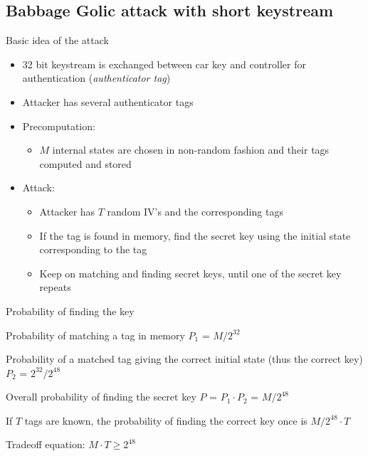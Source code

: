 \documentclass{beamer}
\begin{document}
\subsection{Babbage Golic attack with short keystream}

\begin{frame}{Basic idea of the attack}
\small{
\begin{itemize}
	\item 32 bit keystream is exchanged between car key and controller for authentication (\emph{authenticator tag})
	\item Attacker has several authenticator tags
	\item Precomputation: 
	\begin{itemize}
		\item $M$ internal states are chosen in non-random fashion and their tags computed and stored
	\end{itemize}
	\item Attack: 
	\begin{itemize}
		\item Attacker has $T$ random IV's and the corresponding tags
		\item If the tag is found in memory, find the secret key using the initial state corresponding to the tag
		\item Keep on matching and finding secret keys, until one of the secret key repeats
	\end{itemize}
\end{itemize}
}
\end{frame}

\begin{frame}{Probability of finding the key}
\begin{itemize}
\small{
	\item Probability of matching a tag in memory $P_1$ = $M/2^{32}$
	\item Probability of a matched tag giving the correct initial state (thus the correct key) $P_2$ = $2^{32}/2^{48}$
	\item Overall probability of finding the secret key $P$ = $P_1 \cdot P_2$ = $M/2^{48}$
	\item If $T$ tags are known, the probability of finding the correct key once is $M/2^{48} \cdot T$
	\item Tradeoff equation: $M \cdot T \geq 2^{48}$
}
\end{itemize}
\end{frame}
\end{document}
